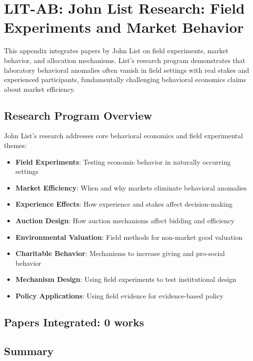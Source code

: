 \section{LIT-AB: John List Research: Field Experiments and Market Behavior}
\label{app:litab}

This appendix integrates papers by John List on field experiments, market behavior, and allocation
mechanisms. List's research program demonstrates that laboratory behavioral anomalies often vanish
in field settings with real stakes and experienced participants, fundamentally challenging behavioral
economics claims about market efficiency.

\subsection{Research Program Overview}

John List's research addresses core behavioral economics and field experimental themes:

\begin{itemize}
  \item \textbf{Field Experiments}: Testing economic behavior in naturally occurring settings
  \item \textbf{Market Efficiency}: When and why markets eliminate behavioral anomalies
  \item \textbf{Experience Effects}: How experience and stakes affect decision-making
  \item \textbf{Auction Design}: How auction mechanisms affect bidding and efficiency
  \item \textbf{Environmental Valuation}: Field methods for non-market good valuation
  \item \textbf{Charitable Behavior}: Mechanisms to increase giving and pro-social behavior
  \item \textbf{Mechanism Design}: Using field experiments to test institutional design
  \item \textbf{Policy Applications}: Using field evidence for evidence-based policy
\end{itemize}

\subsection{Papers Integrated: 0 works}


\subsection{Summary}

